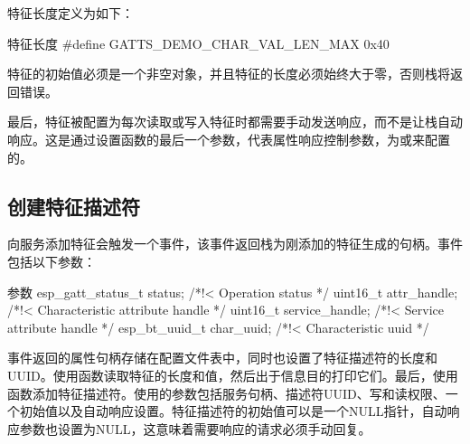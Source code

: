 \documentclass[lang=cn,newtx,10pt,scheme=chinese]{elegantbook}
\begin{document}
特征长度定义为如下：

\begin{mycode}{特征长度}
#define GATTS_DEMO_CHAR_VAL_LEN_MAX 0x40
\end{mycode}

特征的初始值必须是一个非空对象，并且特征的长度必须始终大于零，否则栈将返回错误。

最后，特征被配置为每次读取或写入特征时都需要手动发送响应，而不是让栈自动响应。这是通过设置函数的最后一个参数，代表属性响应控制参数，为或来配置的。

\subsection{创建特征描述符}

向服务添加特征会触发一个事件，该事件返回栈为刚添加的特征生成的句柄。事件包括以下参数：

\begin{mycode}{参数}
esp_gatt_status_t status;          /*!< Operation status */
uint16_t attr_handle;	           /*!< Characteristic attribute handle */
uint16_t service_handle;           /*!< Service attribute handle */
esp_bt_uuid_t char_uuid;           /*!< Characteristic uuid */
\end{mycode}

事件返回的属性句柄存储在配置文件表中，同时也设置了特征描述符的长度和UUID。使用函数读取特征的长度和值，然后出于信息目的打印它们。最后，使用函数添加特征描述符。使用的参数包括服务句柄、描述符UUID、写和读权限、一个初始值以及自动响应设置。特征描述符的初始值可以是一个NULL指针，自动响应参数也设置为NULL，这意味着需要响应的请求必须手动回复。
\end{document}
